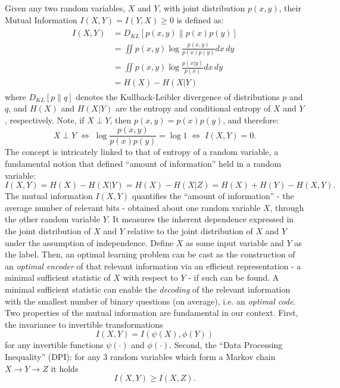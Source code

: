 \documentclass[11pt]{article}
\begin{document}
Given any two random variables, $X$ and $Y$, with joint distribution $p(x, y)$, their Mutual Information $I(X,Y) = I(Y,X) \geq 0$ is defined as:
\begin{align}
\begin{split}
I(X,Y)
&= D_{KL}[p(x,y)\rVert p(x)p(y)] \\[4pt]
&= \iint p(x,y) \log \frac{p(x,y)}{p(x)p(y)} dx\,dy \\
&= \iint p(x,y) \log \frac{p(x\vert y)}{p(x)} dx\,dy \\[4pt]
&= H(X) - H(X\vert Y) 
\end{split}
\end{align}
where $D_{KL}[p\rVert q]$ denotes the Kullback-Leibler divergence of distributions $p$ and $q$, and $H(X)$ and $H(X\vert Y)$ are the entropy and conditional entropy of $X$ and $Y$, respectively. Note, if $X \perp Y$, then $p(x,y) = p(x)p(y)$, and therefore:
\begin{equation}
X \perp Y \; \Leftrightarrow \; \log\frac{p(x,y)}{p(x)p(y)} = \log 1 \; \Leftrightarrow \; I(X,Y) = 0.
\end{equation}
The concept is intricately linked to that of entropy of a random variable, a fundamental notion that defined ``amount of information'' held in a random variable:
\begin{equation}
I(X,Y) = H(X) - H(X \vert Y) = H(X) - H(X \vert Z) = H(X) + H(Y) - H(X,Y).
\end{equation}
The mutual information $I(X,Y)$ quantifies the ``amount of information'' - the average number of relevant bits - obtained about one random variable $X$, through the other random variable $Y$. It measures the inherent dependence expressed in the joint distribution of $X$ and $Y$ relative to the joint distribution of $X$ and $Y$ under the assumption of independence. Define $X$ as some input variable and $Y$ as the label. Then, an optimal learning problem can be cast as the construction of an \textit{optimal encoder} of that relevant information via an efficient representation - a minimal sufficient statistic of $X$ with respect to $Y$ - if such can be found. A minimal sufficient statistic can enable the \textit{decoding} of the relevant information with the smallest number of binary questions (on average), i.e. an \textit{optimal code}.
Two properties of the mutual information are fundamental in our context. First, the invariance to invertible transformations
\begin{equation}
I(X,Y) = I(\psi(X), \phi(Y))
\end{equation}
for any invertible functions $\psi(\cdot)$ and $\phi(\cdot)$. Second, the ``Data Processing Inequality'' (DPI): for any 3 random variables which form a Markov chain $X\rightarrow Y \rightarrow Z$ it holds
\begin{equation}
I(X,Y) \geq I(X,Z).
\end{equation}
\end{document}
